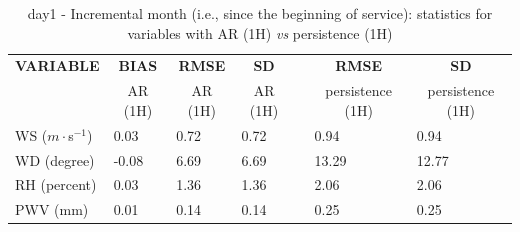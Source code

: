 \begin{table}[]
\begin{center}
\begin{tabular}{|l|l|l|l|l|l|l|}
\hline
\multicolumn{1}{|c|}{\cellcolor[HTML]{C0C0C0}\textbf{VARIABLE}} & \multicolumn{1}{c|}{\cellcolor[HTML]{C0C0C0}\textbf{BIAS}} & \multicolumn{1}{c|}{\cellcolor[HTML]{C0C0C0}\textbf{RMSE}} & \multicolumn{1}{c|}{\cellcolor[HTML]{C0C0C0}\textbf{SD}} & & \multicolumn{1}{c|}{\cellcolor[HTML]{C0C0C0}\textbf{RMSE}} & \multicolumn{1}{c|}{\cellcolor[HTML]{C0C0C0}\textbf{SD}}\\
\multicolumn{1}{|c|}{\cellcolor[HTML]{C0C0C0}} & \multicolumn{1}{c|}{\cellcolor[HTML]{C0C0C0}AR (1H)} & \multicolumn{1}{c|}{\cellcolor[HTML]{C0C0C0}AR (1H)} & \multicolumn{1}{c|}{\cellcolor[HTML]{C0C0C0}AR (1H)} & & \multicolumn{1}{c|}{\cellcolor[HTML]{C0C0C0} persistence (1H)} & \multicolumn{1}{c|}{\cellcolor[HTML]{C0C0C0}persistence (1H)}\\\hline
\cellcolor[HTML]{C0C0C0}WS ($m\cdot$s$^{-1}$) &      0.03  &      0.72  &      0.72  & &      0.94  &      0.94\\
\cellcolor[HTML]{C0C0C0}WD (degree)           &     -0.08  &      6.69  &      6.69  & &     13.29  &     12.77\\
\cellcolor[HTML]{C0C0C0}RH (percent)          &      0.03  &      1.36  &      1.36  & &      2.06  &      2.06\\
\cellcolor[HTML]{C0C0C0}PWV (mm)              &      0.01 &      0.14 &      0.14 & &      0.25 &      0.25\\
\hline
\end{tabular}
\caption{day1 - Incremental month (i.e., since the beginning of service): statistics for variables with AR (1H) \textit{vs} persistence (1H)}\label{tab:day1:statAFT:IM}
\end{center}
\end{table}

